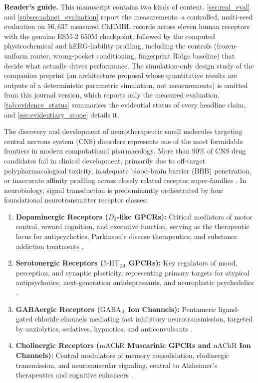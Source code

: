 \documentclass{article}
\theoremstyle{definition}
\begin{document}
\textbf{Reader's guide.} This manuscript contains two kinds of content. \cref{sec:real_eval} and \cref{subsec:admet_evaluation} report the measurements: a controlled, multi-seed evaluation on $56{,}637$ measured ChEMBL records across eleven human receptors with the genuine ESM-2 650M checkpoint, followed by the computed physicochemical and hERG-liability profiling, including the controls (frozen-uniform router, wrong-pocket conditioning, fingerprint Ridge baseline) that decide what actually drives performance. The simulation-only design study of the companion preprint (an architecture proposal whose quantitative results are outputs of a deterministic parametric simulation, not measurements) is omitted from this journal version, which reports only the measured evaluation. \cref{tab:evidence_status} summarises the evidential status of every headline claim, and \cref{sec:evidentiary_scope} details it.


The discovery and development of neurotherapeutic small molecules targeting central nervous system (CNS) disorders represents one of the most formidable frontiers in modern computational pharmacology. More than $90\%$ of CNS drug candidates fail in clinical development, primarily due to off-target polypharmacological toxicity, inadequate blood-brain barrier (BBB) penetration, or inaccurate affinity profiling across closely related receptor super-families \citep{mendez2019chembl,kooistra2021gpcrdb}. In neurobiology, signal transduction is predominantly orchestrated by four foundational neurotransmitter receptor classes:
\begin{enumerate}[leftmargin=1.8em,noitemsep]
    \item \textbf{Dopaminergic Receptors ($D_2$-like GPCRs):} Critical mediators of motor control, reward cognition, and executive function, serving as the therapeutic locus for antipsychotics, Parkinson's disease therapeutics, and substance addiction treatments \citep{wang2018structure}.
    \item \textbf{Serotonergic Receptors ($5\text{-HT}_{2A}$ GPCRs):} Key regulators of mood, perception, and synaptic plasticity, representing primary targets for atypical antipsychotics, next-generation antidepressants, and neuroplastic psychedelics \citep{kimura2019structures}.
    \item \textbf{GABAergic Receptors ($\text{GABA}_A$ Ion Channels):} Pentameric ligand-gated chloride channels mediating fast inhibitory neurotransmission, targeted by anxiolytics, sedatives, hypnotics, and anticonvulsants \citep{zhu2018structure}.
    \item \textbf{Cholinergic Receptors ($\text{mAChR}$ Muscarinic GPCRs and $\text{nAChR}$ Ion Channels):} Central modulators of memory consolidation, cholinergic transmission, and neuromuscular signaling, central to Alzheimer's therapeutics and cognitive enhancers \citep{haga2012structure}.
\end{enumerate}
\end{document}
